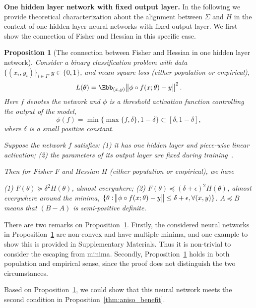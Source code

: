 \documentclass{article}
\newtheorem{proposition}{Proposition}
\begin{document}
\textbf{One hidden layer network with fixed output layer.} 
In the following we provide theoretical characterization about the alignment between $\Sigma$ and $H$ in the context of one hidden layer neural networks with fixed output layer.
We first show the connection of Fisher and Hessian in this specific case.

\begin{proposition}[The connection between Fisher and Hessian in one hidden layer network]
Consider a binary classification problem with data $\{(x_i, y_i)\}_{i\in I}, y\in\{0,1\}$, and mean square loss (either population or empirical),
\begin{equation}
    L(\theta) = \Ebb_{(x,y)}\norm{ \phi \circ f(x; \theta) - y}^2.
\end{equation}
Here $f$ denotes the network and $\phi$ is a threshold activation function controlling the output of the model,
\begin{equation}
    \phi (f) = \min \{\max \{f, \delta \}, 1-\delta\} \subset [\delta, 1-\delta],
\end{equation}
where $\delta$ is a small positive constant.

Suppose the network $f$ satisfies:
(1) it has one hidden layer and piece-wise linear activation;
(2) the parameters of its output layer are fixed during training~\cite{brutzkus2017sgd}.

Then for Fisher $F$ and Hessian $H$ (either population or empirical), we have

(1) $F(\theta) \succeq \delta ^2 H(\theta)$, almost everywhere; 
(2) $F(\theta) \preceq (\delta+\epsilon)^2 H(\theta)$, almost everywhere around the minima, $\{\theta : \norm{\phi \circ f(x;\theta)-y} \le \delta + \epsilon, \forall (x,y) \}$. 
$A\preceq B$ means that $(B-A)$ is semi-positive definite.
\label{thm:F_H}
\end{proposition}

There are two remarks on Proposition~\ref{thm:F_H}.
Firstly, the considered neural networks in Proposition~\ref{thm:F_H} are non-convex and have multiple minima, and one example to show this is provided in Supplementary Materials. Thus it is non-trivial to consider the escaping from minima.
Secondly, Proposition~\ref{thm:F_H} holds in both population and empirical sense, since the proof does not distinguish the two circumstances.

Based on Proposition~\ref{thm:F_H}, we could show that this neural network meets the second condition in Proposition~\ref{thm:aniso_benefit}.
\end{document}
